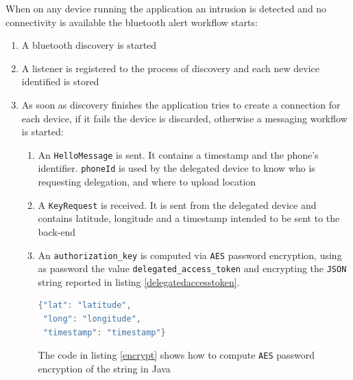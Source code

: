\documentclass[conference, 11pt]{IEEEtran}
\begin{document}
When on any device running the application an intrusion is detected and no connectivity is available the bluetooth alert workflow starts:\\
\begin{enumerate}
	\item A bluetooth discovery is started
	\item A listener is registered to the process of discovery and each new device identified is stored
	\item As soon as discovery finishes the application tries to create a connection for each device, if it fails the device is discarded, otherwise a messaging workflow is started:
		\begin{enumerate}

			\item An \texttt{HelloMessage} is sent. It contains a timestamp and the phone's identifier. \texttt{phoneId} is used by the delegated device to know who is requesting delegation, and where to upload location
			\item A \texttt{KeyRequest} is received. It is sent from the delegated device and contains latitude, longitude and a timestamp intended to be sent to the back-end
			\item An \texttt{authorization\_key} is computed via \texttt{AES} password encryption, using as password the value \texttt{delegated\_access\_token} and encrypting the \texttt{JSON} string reported in listing \ref{delegatedaccesstoken}.

\begin{lstlisting}[float, language=Java, caption=JSON encrypted with AES, label=delegatedaccesstoken]
{"lat": "latitude",
 "long": "longitude",
 "timestamp": "timestamp"}
\end{lstlisting}


			The code in listing \ref{encrypt} shows how to compute \texttt{AES} password encryption of the string in Java


\end{enumerate}
\end{enumerate}
\end{document}
